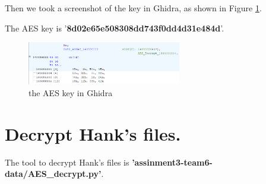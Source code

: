 \documentclass[11pt]{article}
\begin{document}
Then we took a screenshot of the key in Ghidra, as shown in Figure \ref{fig:key}.

The AES key is '\textbf{8d02e65e508308dd743f0dd4d31e484d}'.
\begin{figure}[htbp]
    \centering
    \includegraphics[width=0.6\textwidth]{img/key.png}
    \caption{the AES key in Ghidra}
    \label{fig:key}
\end{figure}

\section{Decrypt Hank's files.}
The tool to decrypt Hank's files is \textbf{'assinment3-team6-data/AES\_decrypt.py'}.





\end{document}
